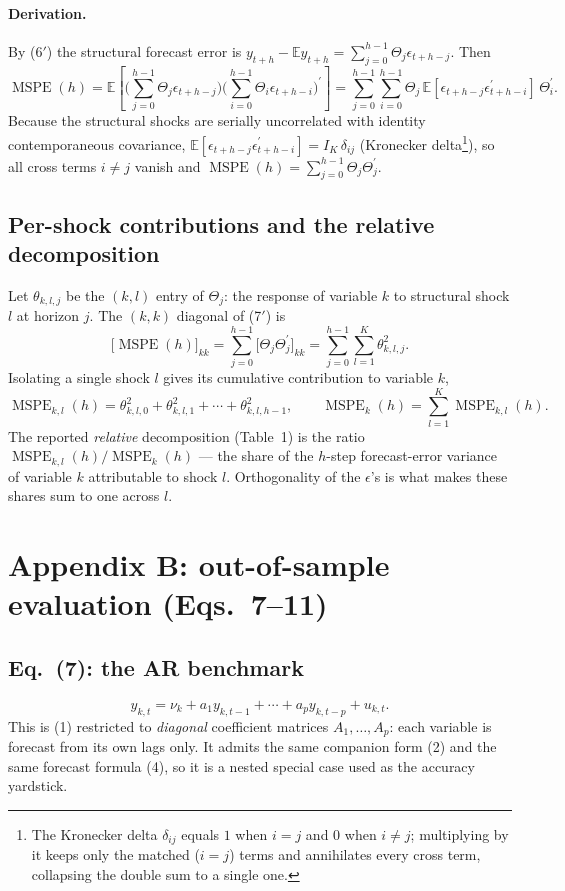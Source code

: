 \documentclass[11pt]{article}
\newcommand{\E}{\mathbb{E}}
\newcommand{\tp}{^{\prime}}
\DeclareMathOperator{\MSPE}{MSPE}
\theoremstyle{remark}
\begin{document}
\paragraph{Derivation.} By (6$'$) the structural forecast error is
$y_{t+h}-\E y_{t+h}=\sum_{j=0}^{h-1}\Theta_j\epsilon_{t+h-j}$. Then
\[
\MSPE(h)=\E\!\left[\Big(\sum_{j=0}^{h-1}\Theta_j\epsilon_{t+h-j}\Big)
\Big(\sum_{i=0}^{h-1}\Theta_i\epsilon_{t+h-i}\Big)\tp\right]
=\sum_{j=0}^{h-1}\sum_{i=0}^{h-1}\Theta_j\,\E[\epsilon_{t+h-j}\epsilon_{t+h-i}\tp]\,\Theta_i\tp.
\]
Because the structural shocks are serially uncorrelated with identity
contemporaneous covariance, $\E[\epsilon_{t+h-j}\epsilon_{t+h-i}\tp]=I_K\,\delta_{ij}$
(Kronecker delta\footnote{The Kronecker delta $\delta_{ij}$ equals $1$ when $i=j$ and $0$ when $i\neq j$; multiplying by it keeps only the matched ($i=j$) terms and annihilates every cross term, collapsing the double sum to a single one.}), so all cross terms $i\neq j$ vanish and
$\MSPE(h)=\sum_{j=0}^{h-1}\Theta_j\Theta_j\tp$. 

\subsection*{Per-shock contributions and the relative decomposition}
Let $\theta_{k,l,j}$ be the $(k,l)$ entry of $\Theta_j$: the response of variable
$k$ to structural shock $l$ at horizon $j$. The $(k,k)$ diagonal of (7$'$) is
\[
\big[\MSPE(h)\big]_{kk}
=\sum_{j=0}^{h-1}\big[\Theta_j\Theta_j\tp\big]_{kk}
=\sum_{j=0}^{h-1}\sum_{l=1}^{K}\theta_{k,l,j}^{2}.
\]
Isolating a single shock $l$ gives its cumulative contribution to variable $k$,
\begin{equation}
\MSPE_{k,l}(h)=\theta_{k,l,0}^2+\theta_{k,l,1}^2+\cdots+\theta_{k,l,h-1}^2,
\qquad
\MSPE_{k}(h)=\sum_{l=1}^{K}\MSPE_{k,l}(h). \tag{7$''$}
\end{equation}
The reported \emph{relative} decomposition (Table~1) is the ratio
$\MSPE_{k,l}(h)/\MSPE_{k}(h)$ — the share of the $h$-step forecast-error variance
of variable $k$ attributable to shock $l$. Orthogonality of the $\epsilon$'s is
what makes these shares sum to one across $l$.

\section{Appendix B: out-of-sample evaluation (Eqs.~7--11)}
\subsection*{Eq.~(7): the AR benchmark}
\begin{equation}
y_{k,t}=\nu_k+a_1y_{k,t-1}+\cdots+a_py_{k,t-p}+u_{k,t}. \tag{7}
\end{equation}
This is (1) restricted to \emph{diagonal} coefficient matrices $A_1,\dots,A_p$:
each variable is forecast from its own lags only. It admits the same companion
form (2) and the same forecast formula (4), so it is a nested special case used
as the accuracy yardstick.
\end{document}
